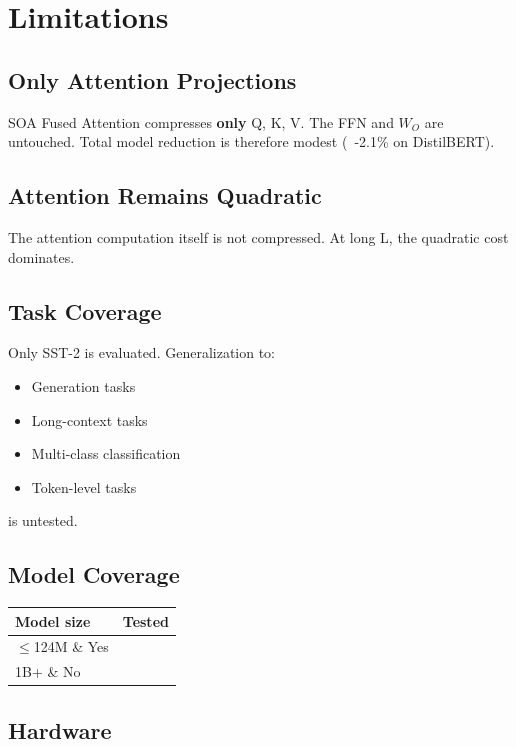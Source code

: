 \section{Limitations}

\subsection{Only Attention Projections}

SOA Fused Attention compresses \textbf{only} Q, K, V. The FFN and $W_O$ are 
untouched. Total model reduction is therefore modest (~-2.1\% 
on DistilBERT).

\subsection{Attention Remains Quadratic}

The attention computation itself is not compressed. At long L, the quadratic 
cost dominates.

\subsection{Task Coverage}

Only SST-2 is evaluated. Generalization to:
\begin{itemize}
\item Generation tasks
\item Long-context tasks
\item Multi-class classification
\item Token-level tasks

\end{itemize}
is untested.

\subsection{Model Coverage}

\begin{table}[H]
\centering
\small
\begin{tabular}{ll}
\toprule
\textbf{Model size} & \textbf{Tested} \\
\midrule
$\le$124M \& Yes \\
1B+ \& No \\
\bottomrule
\end{tabular}
\end{table}

\subsection{Hardware}

